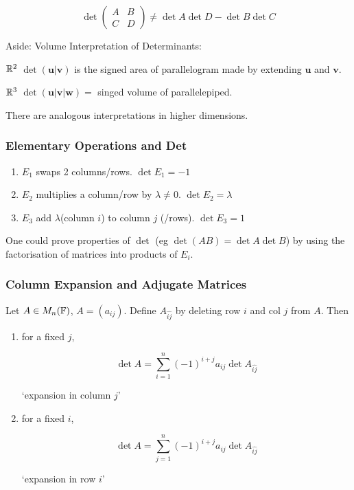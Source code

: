 \documentclass[a4paper]{article}
\begin{document}
\[ \det \begin{pmatrix}
A & B \\
C & D
\end{pmatrix} \neq \det A \det D - \det B \det C \]

Aside: Volume Interpretation of Determinants:

$ \mathbb{R}^{2} $ $ \det( \mathbf{u} | \mathbf{v} ) $ is the signed area of parallelogram made by extending $ \mathbf{u} $ and $ \mathbf{v} $. 

$ \mathbb{R}^{3} $ $ \det( \mathbf{u} | \mathbf{v} | \mathbf{w}) = $ singed volume of parallelepiped.

There are analogous interpretations in higher dimensions. 

\subsubsection{Elementary Operations and Det}

\begin{enumerate}
	\item $ E_{1} $ swaps 2 columns/rows. $ \det E_{1}  = -1 $
	\item $ E_{2} $ multiplies a column/row by $ \lambda \neq 0 $. $ \det E_{2} = \lambda  $
	\item $ E_{3} $ add $ \lambda $(column $ i $) to column $ j $ (/rows). $ \det E_{3} = 1 $
	
\end{enumerate} 	

One could prove properties of $ \det $ (eg $ \det (AB) = \det A \det B $) by using the factorisation of matrices into products of $ E_{i} $.

\subsubsection{Column Expansion and Adjugate Matrices}
\begin{lemma} 
	Let $ A \in M_{n}(\mathbb{F}) $, $ A = (a_{ij}) $. Define $ A_{\hat{ij}} $ by deleting row $ i $ and col $ j $ from $ A $. Then
	\begin{enumerate}
		\item for a fixed $ j $, 
		
		\[ \det A = \sum_{i=1}^{n} (-1)^{i+j}a_{ij}\det A_{\hat{ij}} \]
		
		`expansion in column $ j $'
		\item for a fixed $ i $,
		
		\[ \det A = \sum_{j=1}^{n} (-1)^{i+j}a_{ij}\det A_{\hat{ij}} \]
		
		`expansion in row $ i $'
	\end{enumerate}
\end{lemma} 
\end{document}
